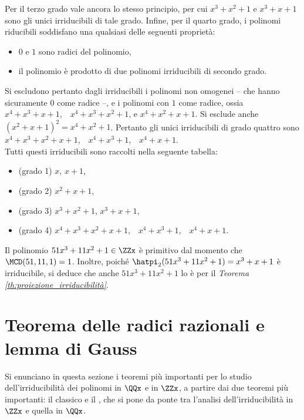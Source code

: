 Per il terzo grado vale ancora lo stesso principio, per cui
$x^3+x^2+1$ e $x^3+x+1$ sono gli unici irriducibili di tale grado.
Infine, per il quarto grado, i polinomi riducibili soddisfano
una qualsiasi delle seguenti proprietà:

\begin{itemize}
    \item $0$ e $1$ sono radici del polinomio,
    \item il polinomio è prodotto di due polinomi irriducibili di
          secondo grado.
\end{itemize}

Si escludono pertanto dagli irriducibili i polinomi non omogenei --
che hanno sicuramente $0$ come radice --, e i polinomi con $1$ come
radice, ossia $x^4+x^3+x+1$,\ \
$x^4+x^3+x^2+1$, e $x^4+x^2+x+1$. Si esclude anche
$(x^2+x+1)^2 = x^4+x^2+1$. Pertanto gli unici irriducibili di
grado quattro sono $x^4+x^3+x^2+x+1$,\ \ $x^4+x^3+1$,\ \  $x^4+x+1$. \\

Tutti questi irriducibili sono raccolti nella seguente tabella:

\begin{itemize}
    \item (grado 1) $x$, $x+1$,
    \item (grado 2) $x^2+x+1$,
    \item (grado 3) $x^3+x^2+1$, $x^3+x+1$,
    \item (grado 4) $x^4+x^3+x^2+x+1$,\ \ $x^4+x^3+1$,\ \ $x^4+x+1$.
\end{itemize}

\begin{example}
    Il polinomio $51x^3+11x^2+1 \in \ZZx$ è primitivo dal momento
    che $\MCD(51, 11, 1)=1$. Inoltre, poiché $\hatpi_2(51x^3+11x^2+1)=
        x^3+x+1$ è irriducibile, si deduce che anche $51x^3+11x^2+1$ lo
    è per il \textit{Teorema \ref{th:proiezione_irriducibilità}}.
\end{example}

\section{Teorema delle radici razionali e lemma di Gauss}

Si enunciano in questa sezione i teoremi più importanti per
lo studio dell'irriducibilità dei polinomi in $\QQx$ e
in $\ZZx$, a partire dai due teoremi più importanti: il
classico  e il ,
che si pone da ponte tra l'analisi dell'irriducibilità in $\ZZx$ e
quella in $\QQx$.

